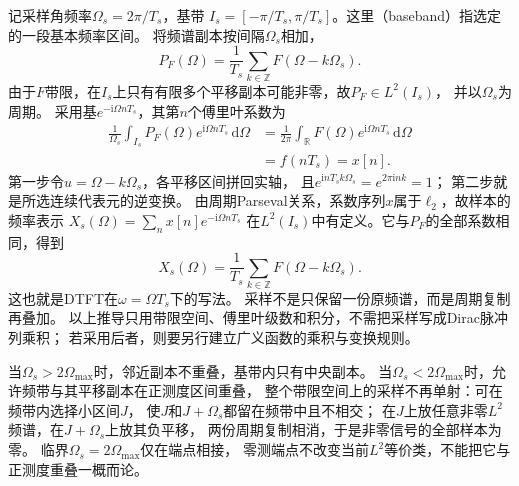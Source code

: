 记采样角频率$\Omega_s=2\pi/T_s$，基带
$I_s=[-\pi/T_s,\pi/T_s]$。这里（baseband）指选定的一段基本频率区间。
将频谱副本按间隔$\Omega_s$相加，
\[
  P_F(\Omega)=\frac1{T_s}\sum_{k\in\mathbb Z}F(\Omega-k\Omega_s).
\]
由于$F$带限，在$I_s$上只有有限多个平移副本可能非零，故$P_F\in L^2(I_s)$，
并以$\Omega_s$为周期。
采用基$e^{-\mathrm i\Omega nT_s}$，其第$n$个傅里叶系数为
\begin{align*}
  \frac1{\Omega_s}\int_{I_s}P_F(\Omega)e^{\mathrm i\Omega nT_s}\,\mathrm d\Omega
  &=\frac1{2\pi}\int_{\mathbb R}F(\Omega)e^{\mathrm i\Omega nT_s}\,\mathrm d\Omega\\
  &=f(nT_s)=x[n].
\end{align*}
第一步令$u=\Omega-k\Omega_s$，各平移区间拼回实轴，
且$e^{\mathrm inT_sk\Omega_s}=e^{2\pi\mathrm ink}=1$；
第二步就是所选连续代表元的逆变换。
由周期Parseval关系，系数序列$x$属于$\ell_2$，故样本的频率表示
$X_s(\Omega)=\sum_n x[n]e^{-\mathrm i\Omega nT_s}$
在$L^2(I_s)$中有定义。它与$P_F$的全部系数相同，得到
\begin{equation}
  X_s(\Omega)=\frac1{T_s}\sum_{k\in\mathbb Z}F(\Omega-k\Omega_s).
  \label{eq:signal-analysis-spectral-replication}
\end{equation}
这也就是DTFT在$\omega=\Omega T_s$下的写法。
采样不是只保留一份原频谱，而是周期复制再叠加。
以上推导只用带限空间、傅里叶级数和积分，不需把采样写成Dirac脉冲列乘积；
若采用后者，则要另行建立广义函数的乘积与变换规则。

当$\Omega_s>2\Omega_{\max}$时，邻近副本不重叠，基带内只有中央副本。
当$\Omega_s<2\Omega_{\max}$时，允许频带与其平移副本在正测度区间重叠，
整个带限空间上的采样不再单射：可在频带内选择小区间$J$，
使$J$和$J+\Omega_s$都留在频带中且不相交；
在$J$上放任意非零$L^2$频谱，在$J+\Omega_s$上放其负平移，
两份周期复制相消，于是非零信号的全部样本为零。
临界$\Omega_s=2\Omega_{\max}$仅在端点相接，
零测端点不改变当前$L^2$等价类，不能把它与正测度重叠一概而论。


